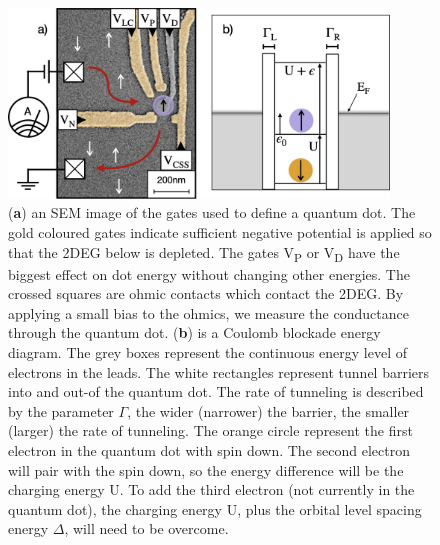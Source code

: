 \begin{figure}[!htb]
  \begin{center}
    \includegraphics[width=0.9\textwidth]{figures/ch1/crop_FiguresMaster.004.png}
    \caption[Quantum dot energy levels]{\label{fig:ch1/dot_energy_levels} 
    (\textbf{a}) an SEM image of the gates used to define a quantum dot. The gold coloured gates indicate sufficient negative potential is applied so that the 2DEG below is depleted. The gates V\textsubscript{P} or V\textsubscript{D} have the biggest effect on dot energy without changing other energies. The crossed squares are ohmic contacts which contact the 2DEG. By applying a small bias to the ohmics, we measure the conductance through the quantum dot. (\textbf{b}) is a Coulomb blockade energy diagram. The grey boxes represent the continuous energy level of electrons in the leads. The white rectangles represent tunnel barriers into and out-of the quantum dot. The rate of tunneling is described by the parameter $\Gamma$, the wider (narrower) the barrier, the smaller (larger) the rate of tunneling. The orange circle represent the first electron in the quantum dot with spin down. The second electron will pair with the spin down, so the energy difference will be the charging energy $\mathrm{U}$. To add the third electron (not currently in the quantum dot), the charging energy $\mathrm{U}$, plus the orbital level spacing energy $\Delta$, will need to be overcome.}
  \end{center}
\end{figure}



